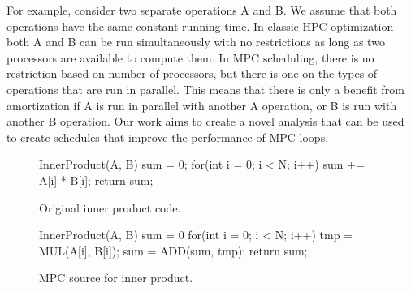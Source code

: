 
For example, consider two separate operations A and B. We assume that both operations have 
the same constant running time. In classic HPC optimization both A and B can be run simultaneously with no 
restrictions as long as two processors are available to compute them. In MPC scheduling,
there is no restriction based on number of processors, but there is one on the types of
operations that are run in parallel. This means that there is only a benefit from amortization if A is run in parallel 
with another A operation, or B is run with another B operation. Our work aims to create a novel analysis 
that can be used to create schedules that improve the performance of MPC loops. 



\begin{figure}[h]
\centering
\begin{minipage}{0.7\textwidth}
\begin{javacode}
  InnerProduct(A, B) {
      sum = 0;
      for(int i = 0; i < N; i++) {
          sum += A[i] * B[i];
      }
      return sum;
  }
\end{javacode}
\end{minipage}
\caption{Original inner product code.}
\label{fig:innerproduct}
\end{figure}

\begin{figure}[h]
\centering
\begin{minipage}{0.7\textwidth}
\begin{javacode}
  InnerProduct(A, B) {
      sum = 0
      for(int i = 0; i < N; i++) {
          tmp = MUL(A[i], B[i]);
          sum = ADD(sum, tmp);
      }
      return sum;
  }
\end{javacode}
\end{minipage}
\caption{MPC source for inner product.}
\label{fig:innerproductmpc}
\end{figure}

